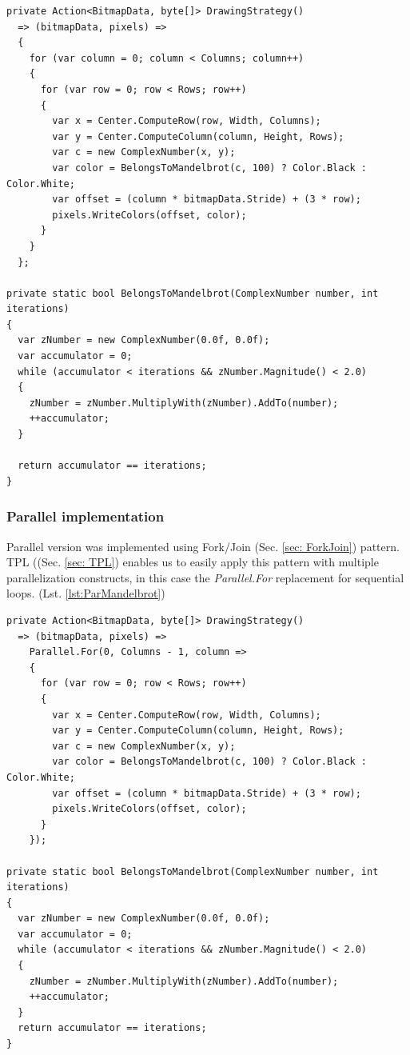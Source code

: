 \begin{lstlisting}[style=sharpcstyle, caption={Sequential Mandelbrot algorithm}, label={lst:SeqMandelbrot}]
private Action<BitmapData, byte[]> DrawingStrategy()
  => (bitmapData, pixels) =>
  {
    for (var column = 0; column < Columns; column++) 
    {
      for (var row = 0; row < Rows; row++) 
      {
        var x = Center.ComputeRow(row, Width, Columns); 
        var y = Center.ComputeColumn(column, Height, Rows); 
        var c = new ComplexNumber(x, y);
        var color = BelongsToMandelbrot(c, 100) ? Color.Black : Color.White; 
        var offset = (column * bitmapData.Stride) + (3 * row);
        pixels.WriteColors(offset, color);
      }
    }
  };

private static bool BelongsToMandelbrot(ComplexNumber number, int iterations)
{
  var zNumber = new ComplexNumber(0.0f, 0.0f);
  var accumulator = 0;
  while (accumulator < iterations && zNumber.Magnitude() < 2.0)
  {
    zNumber = zNumber.MultiplyWith(zNumber).AddTo(number);
    ++accumulator;
  }

  return accumulator == iterations;
}
\end{lstlisting}

\subsubsection{Parallel implementation}
Parallel version was implemented using Fork/Join (Sec. \ref{sec: ForkJoin}) pattern. TPL ((Sec. \ref{sec: TPL})  enables us to easily apply this pattern with multiple parallelization constructs, in this case the \emph{Parallel.For} replacement for sequential loops. (Lst. \ref{lst:ParMandelbrot})

\begin{lstlisting}[style=sharpcstyle, caption={Parallel Mandelbrot algorithm}, label={lst:ParMandelbrot}]
private Action<BitmapData, byte[]> DrawingStrategy()
  => (bitmapData, pixels) =>
    Parallel.For(0, Columns - 1, column =>
    {
      for (var row = 0; row < Rows; row++)
      {
        var x = Center.ComputeRow(row, Width, Columns);
        var y = Center.ComputeColumn(column, Height, Rows);
        var c = new ComplexNumber(x, y);
        var color = BelongsToMandelbrot(c, 100) ? Color.Black : Color.White;
        var offset = (column * bitmapData.Stride) + (3 * row);
        pixels.WriteColors(offset, color);
      }
    });

private static bool BelongsToMandelbrot(ComplexNumber number, int iterations)
{
  var zNumber = new ComplexNumber(0.0f, 0.0f);
  var accumulator = 0;
  while (accumulator < iterations && zNumber.Magnitude() < 2.0)
  {
    zNumber = zNumber.MultiplyWith(zNumber).AddTo(number);
    ++accumulator;
  }
  return accumulator == iterations;
}
\end{lstlisting}

